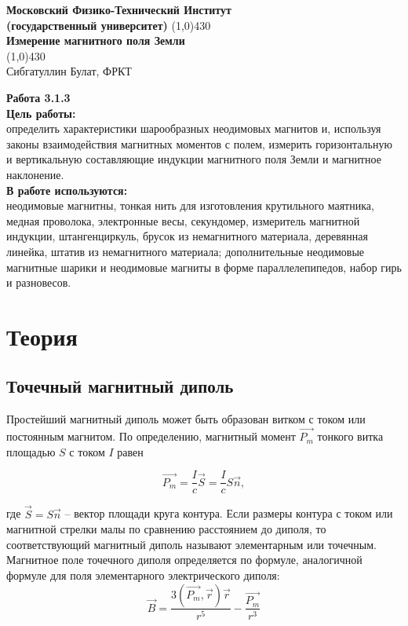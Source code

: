 \documentclass[a4paper,12pt]{article}
\begin{document}
\begin{titlepage}

\begin{center}
\large\textbf{Московский Физико-Технический Институт}\\
\large\textbf{(государственный университет)}
\vfill
\line(1,0){430}\\[1mm]
\huge\textbf{Измерение магнитного поля Земли}\\
\line(1,0){430}\\[1mm]
\vfill
\large Сибгатуллин Булат, ФРКТ\\
\end{center}

\end{titlepage}
\textbf{Работа 3.1.3}\\
\noindent \textbf{Цель работы:} \\
\indent определить характеристики шарообразных неодимовых магнитов и, используя
законы взаимодействия магнитных моментов с полем, измерить горизонтальную и вертикальную
составляющие индукции магнитного поля Земли и магнитное наклонение.\\
\noindent \textbf{В работе используются:} \\
\indent неодимовые магнитны, тонкая нить для
изготовления крутильного маятника, медная проволока, электронные весы,
секундомер, измеритель магнитной индукции, штангенциркуль, брусок из немагнитного
материала, деревянная линейка, штатив из немагнитного материала;
дополнительные неодимовые магнитные шарики и неодимовые магниты в форме параллелепипедов, набор гирь и разновесов.

\section*{Теория}
\subsection*{Точечный магнитный диполь}
Простейший магнитный диполь может быть образован витком с током или постоянным магнитом. По определению, магнитный момент $\overrightarrow{P_m}$ тонкого витка площадью $S$ с током $I$ равен

\begin{equation}
\overrightarrow{P_m}=\frac{I}{c}\vec{S}=\frac{I}{c}S\vec{n},
\end{equation}

где $\vec{S}=S\vec{n}$ -- вектор площади круга контура. Если размеры контура с током или магнитной стрелки малы по сравнению расстоянием до диполя, то соответствующий магнитный диполь называют элементарным или точечным.\\
Магнитное поле точечного диполя определяется по формуле, аналогичной формуле для поля
элементарного электрического диполя:
\begin{equation}
\vec{B}=\frac{3(\overrightarrow{P_m},\vec{r})\vec{r}}{r^5} - \frac{\overrightarrow{P_m}}{r^3}
\end{equation}
\end{document}
